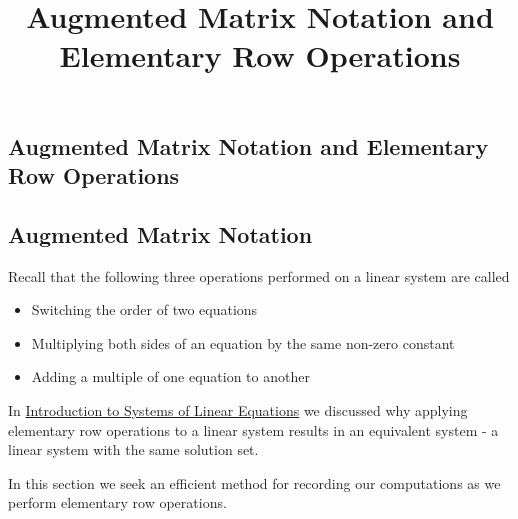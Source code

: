 \documentclass{ximera}
\title{Augmented Matrix Notation and Elementary Row Operations} \license{CC BY-NC-SA 4.0}
\begin{document}
\begin{abstract}
 \end{abstract}
\maketitle

\begin{onlineOnly}
\section*{Augmented Matrix Notation and Elementary Row Operations}
\end{onlineOnly}

\subsection*{Augmented Matrix Notation}

Recall that the following three operations performed on a linear system are called 
\begin{itemize}
\item Switching the order of two equations
\item Multiplying both sides of an equation by the same non-zero constant
\item Adding a multiple of one equation to another
\end{itemize}


In \href{https://ximera.osu.edu/linearalgebradzv3/LinearAlgebraInteractiveIntro/SYS-0010/main}{Introduction to Systems of Linear Equations} we discussed why applying elementary row operations to a linear system results in an equivalent system - a linear system with the same solution set.

In this section we seek an efficient method for recording our computations as we perform elementary row operations. 
\end{document}
